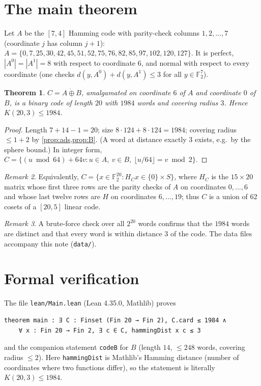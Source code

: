\documentclass[11pt]{article}
\numberwithin{equation}{section}
\newtheorem{theorem}{Theorem}[section]
\theoremstyle{definition}
\theoremstyle{remark}
\newtheorem{remark}[theorem]{Remark}
\newcommand{\F}{\mathbb F}
\begin{document}
\section{The main theorem}
Let $A$ be the $[7,4]$ Hamming code with parity-check columns $1,2,\dots,7$ (coordinate $j$ has column
$j+1$):
$A=\{0,7,25,30,42,45,51,52,75,76,82,85,97,102,120,127\}$. It is perfect, $|A^0|=|A^1|=8$ with respect to
coordinate $6$, and normal with respect to every coordinate (one checks
$d(y,A^0)+d(y,A^1)\le3$ for all $y\in\F_2^7$).

\begin{theorem}\label{thm:main}
$C=A\dot\oplus B$, amalgamated on coordinate $6$ of $A$ and coordinate $0$ of $B$, is a binary code of
length $20$ with $1984$ words and covering radius $3$. Hence $K(20,3)\le1984$.
\end{theorem}
\begin{proof}
Length $7+14-1=20$; size $8\cdot124+8\cdot124=1984$; covering radius $\le1+2$ by
\cref{prop:ads,prop:B}. (A word at distance exactly $3$ exists, e.g.\ by the sphere bound.)
In integer form, $C=\{(u \bmod 64)+64v : u\in A,\ v\in B,\ \lfloor u/64\rfloor = v\bmod 2\}$.
\end{proof}

\begin{remark}
Equivalently, $C=\{x\in\F_2^{20}: H_Cx\in\{0\}\times S\}$, where $H_C$ is the $15\times20$ matrix whose first
three rows are the parity checks of $A$ on coordinates $0,\dots,6$ and whose last twelve rows are $H$ on
coordinates $6,\dots,19$; thus $C$ is a union of $62$ cosets of a $[20,5]$ linear code.
\end{remark}

\begin{remark}
A brute-force check over all $2^{20}$ words confirms that the $1984$ words are distinct and that every
word is within distance $3$ of the code. The data files accompany this note (\texttt{data/}).
\end{remark}

\section{Formal verification}\label{sec:lean}
The file \texttt{lean/Main.lean} (Lean 4.35.0, Mathlib) proves
\begin{lstlisting}
theorem main : ∃ C : Finset (Fin 20 → Fin 2), C.card ≤ 1984 ∧
    ∀ x : Fin 20 → Fin 2, ∃ c ∈ C, hammingDist x c ≤ 3
\end{lstlisting}
and the companion statement \texttt{codeB} for $B$ (length $14$, $\le248$ words, covering radius $\le2$).
Here \texttt{hammingDist} is Mathlib's Hamming distance (number of coordinates where two functions
differ), so the statement is literally $K(20,3)\le1984$.
\end{document}
